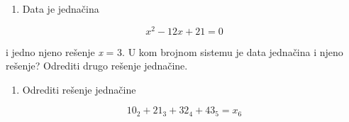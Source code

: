 \documentclass[a4paper,11pt]{article}
\numberwithin{equation}{section}
\begin{document}
\begin{enumerate}[label=\alph*),start=2,leftmargin=*]
\item Data je jednačina

\end{enumerate}


\begin{equation}\label{eq:3.2.2}
x^{2} - 12x + 21 = 0
\end{equation}


i jedno njeno rešenje \emph{x} = 3. U kom brojnom sistemu je data jednačina i njeno rešenje? Odrediti drugo rešenje jednačine.



\begin{enumerate}[label=\alph*),start=3,leftmargin=*]
\item Odrediti rešenje jednačine

\end{enumerate}


\begin{equation}\label{eq:3.2.3}
10_{2} + 21_{3} + 32_{4} + 43_{5} = x_{6}
\end{equation}
\end{document}
